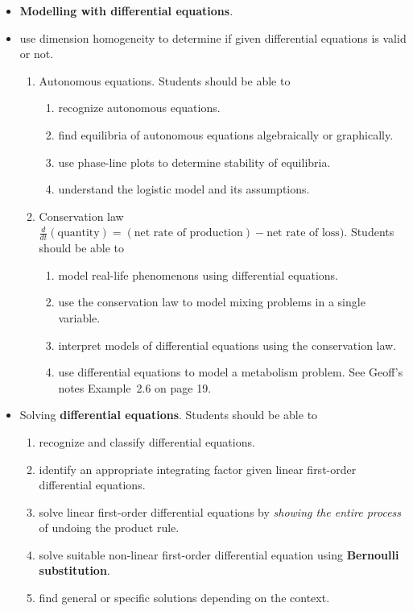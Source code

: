 \documentclass[../main.tex]{subfiles}
\begin{document}
\begin{itemize}
  \item \textbf{Modelling with differential equations}. 
  \item use dimension homogeneity to determine if given differential equations is valid or not.
    \begin{enumerate}
      \item Autonomous equations.  Students should be able to
        \begin{enumerate}
          \item recognize autonomous equations.
          \item find equilibria of autonomous equations algebraically or graphically.
          \item use phase-line plots to determine stability of equilibria.
          \item understand the logistic model and its assumptions.
        \end{enumerate}
      \item Conservation law \(\frac{d}{dt} (\text{quantity}) = (\text{net rate of production}) - \text{net rate of loss})\). Students should be able to
        \begin{enumerate}
          \item model real-life phenomenons using differential equations.
          \item use the conservation law to model mixing problems in a single variable.
          \item interpret models of differential equations using the conservation law.
          \item use differential equations to model a metabolism problem. See Geoff's notes Example~2.6 on page 19.
        \end{enumerate}
    \end{enumerate}

  \item Solving \textbf{differential equations}. Students should be able to
    \begin{enumerate}
      \item recognize and classify differential equations.
      \item identify an appropriate integrating factor given linear first-order differential equations.
      \item solve linear first-order differential equations by \emph{showing the entire process} of undoing the product rule.
      \item solve suitable non-linear first-order differential equation using \textbf{Bernoulli substitution}.
      \item find general or specific solutions depending on the context. 
    \end{enumerate}


\end{itemize}
\end{document}

